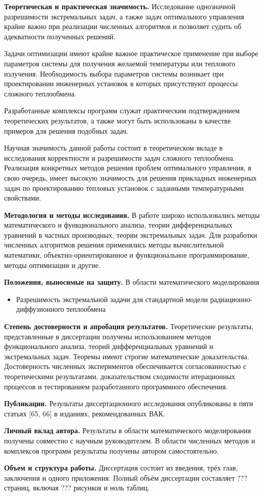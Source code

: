 \textbf{Теоретическая и практическая значимость.}
Исследование однозначной разрешимости экстремальных задач, а также задач оптимального
управления крайне важно при реализации численных алгоритмов и позволяет судить об адекватности полученных решений.

Задачи оптимизации имеют крайне важное практическое применение при выборе параметров системы для
получения желаемой температуры или теплового излучения.
Необходимость выбора параметров системы возникает при проектировании инженерных установок
в которых присутствуют процессы сложного теплообмена.

Разработанные комплексы программ служат практическим подтверждением теоретических результатов,
а также могут быть использованы в качестве примеров для решения подобных задач.


Научная значимость данной работы состоит в теоретическом вкладе в исследования корректности и
разрешимости задач сложного теплообмена.
Реализация конкретных методов решения проблем оптимального управления, в свою очередь, имеет высокую
значимость для решения прикладных инженерных задач по проектированию тепловых установок с
заданными температурными свойствами.


\textbf{Методология и методы исследования.}
В работе широко использовались методы математического и функционального анализа, теории дифференциальных
уравнений в частных производных, теории экстремальных задач.
Для разработки численных алгоритмов решения применялись методы вычислительной математики,
объектно-ориентированное и функциональное программирование, методы оптимизации и другие.


\textbf{Положения, выносимые на защиту.}
В области математического моделирования
\begin{itemize}
    \item Разрешимость экстремальной задачи для стандартной модели радиационно-диффузионного теплообмена
\end{itemize}


\textbf{Степень достоверности и апробация результатов.}
Теоретические результаты, представленные в диссертации получены использованием методов функционального анализа, теорий
дифференциальных уравнений и экстремальных задач.
Теоремы имеют строгие математические доказательства.
Достоверность численных экспериментов обеспечивается согласованностью с теоретическими результатами, доказательством
сходимости итерационных процессов и тестированием разработанного программного обеспечения.

\textbf{Публикации.}
Результаты диссертационного исследования опубликованы в пяти статьях [65, 66] в изданиях, рекомендованных ВАК.


\textbf{Личный вклад автора.}
Результаты в области математического моделирования получены совместно с научным руководителем.
В области численных методов и комплексов программ результаты получены автором самостоятельно.


\textbf{Объем и структура работы.}
Диссертация состоит из введения, трёх глав, заключения и одного приложения.
Полный объём диссертации составляет ??? страниц, включая ??? рисунков и ноль таблиц.








